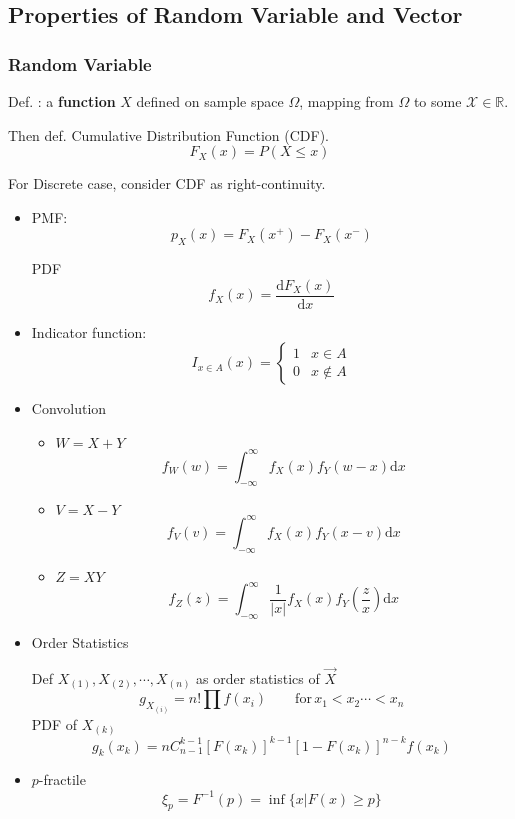 \documentclass[11pt,a4paper]{ctexart}
\numberwithin{equation}{section}%
\begin{document}
\subsection{Properties of Random Variable and Vector}

\subsubsection{Random Variable}
    Def. : a \textbf{function} $X$ defined on sample space $\Omega$, mapping from $\Omega$ to some $\mathscr{X}\in\mathbb{R} $.

    Then def. Cumulative Distribution Function (CDF).
    \[
        F_X(x)=P(X\leq x)
    \]

    For Discrete case, consider CDF as right-continuity.

    \begin{itemize}
        \item

        \begin{center}
            \parbox[t]{8.65cm}{PMF:\[p_X(x)=F_X(x^+)-F_X(x^-)\]}
            \parbox[t]{8.65cm}{PDF
            \[
                f_X(x)=\frac{\mathrm{d}F_X(x)}{\mathrm{d}x}
            \]}
        \end{center}
        
        
        
        \item Indicator function:
        \[
            I_{x\in A}(x)=\begin{cases}
                1& x\in  A\\
                0& x\notin A
            \end{cases}
        \]
        \item Convolution
        \begin{itemize}
            \item $W=X+Y$
            \[
                f_W(w)=\int_{-\infty}^\infty f_X(x)f_Y(w-x)\mathrm{d}x    
            \]
            \item $V=X-Y$
            \[
                f_V(v)=\int_{-\infty}^\infty f_X(x)f_Y(x-v)\mathrm{d}x    
            \]
            \item $Z=XY$
            \[
                f_Z(z)=\int_{-\infty}^\infty \frac{1}{|x|}f_X(x)f_Y(\frac{z}{x})\mathrm{d}x
            \]
        \end{itemize}
        
        \item Order Statistics
        
        Def $X_{(1)},X_{(2)},\cdots,X_{(n)}$ as order statistics of $\vec{X}$
        \[
            g_{X_{(i)}}=n!\prod f(x_i)\qquad \mathrm{for}\, x_1<x_2\cdots <x_n    
        \]
        PDF of $X_{(k)}$
        \[
            g_k(x_k)=nC_{n-1}^{k-1}[F(x_k)]^{k-1}[1-F(x_k)]^{n-k}f(x_k)
        \]
        \item $p$-fractile
        \[\xi_p=F^{-1}(p)=\inf\{x|F(x)\geq p\}\]
    \end{itemize}
\end{document}
